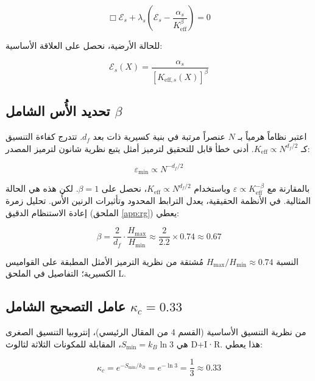 \documentclass[11pt,a4paper]{article}
\newcommand{\Keff}{K_{\mathrm{eff}}}
\newcommand{\kappac}{\kappa_c}
\newcommand{\eps}{\varepsilon}
\newcommand{\df}{d_{\!f}}
\begin{document}
	\begin{equation}
		\Box \mathcal{E}_s + \lambda_s \left( \mathcal{E}_s - \frac{\alpha_s}{\Keff^{\beta}} \right) = 0
		\label{eq:error-eom}
	\end{equation}
	
	للحالة الأرضية، نحصل على العلاقة الأساسية:
	
	\begin{equation}
		\mathcal{E}_s(X) = \frac{\alpha_s}{[K_{\mathrm{eff},s}(X)]^{\beta}}
		\label{eq:error-ground}
	\end{equation}
	
	\subsection{تحديد الأُس الشامل \(\beta\)}
	
	اعتبر نظاماً هرمياً بـ \(N\) عنصراً مرتبة في بنية كسيرية ذات بعد \(\df\). تتدرج كفاءة التنسيق كـ \(\Keff \propto N^{\df/2}\). أدنى خطأ قابل للتحقيق لترميز أمثل يتبع نظرية شانون لترميز المصدر:
	
	\begin{equation}
		\eps_{\min} \propto N^{-\df/2}
		\label{eq:shannon-bound}
	\end{equation}
	
	بالمقارنة مع \(\eps \propto \Keff^{-\beta}\) وباستخدام \(\Keff \propto N^{\df/2}\)، نحصل على \(\beta = 1\). لكن هذه هي الحالة المثالية. في الأنظمة الحقيقية، يعدل الترابط المحدود وتأثيرات الرنين الأُس. تحليل زمرة إعادة الاستنظام الدقيق (الملحق \ref{app:rg}) يعطي:
	
	\begin{equation}
		\beta = \frac{2}{\df} \cdot \frac{H_{\max}}{H_{\min}} \approx \frac{2}{2.2} \times 0.74 \approx 0.67
		\label{eq:beta-derivation}
	\end{equation}
	
	النسبة \(H_{\max}/H_{\min} \approx 0.74\) مُشتقة من نظرية الترميز الأمثل المطبقة على القواميس الكسيرية؛ التفاصيل في الملحق L.
	
	\subsection{عامل التصحيح الشامل \(\kappac = 0.33\)}
	
	من نظرية التنسيق الأساسية (القسم 4 من المقال الرئيسي)، إنتروبيا التنسيق الصغرى هي \(S_{\min} = k_B \ln 3\)، المقابلة للمكونات الثلاثة لثالوث D+I·R. هذا يعطي:
	
	\begin{equation}
		\kappac = e^{-S_{\min}/k_B} = e^{-\ln 3} = \frac{1}{3} \approx 0.33
		\label{eq:kappac-derivation}
	\end{equation}
	
\end{document}
